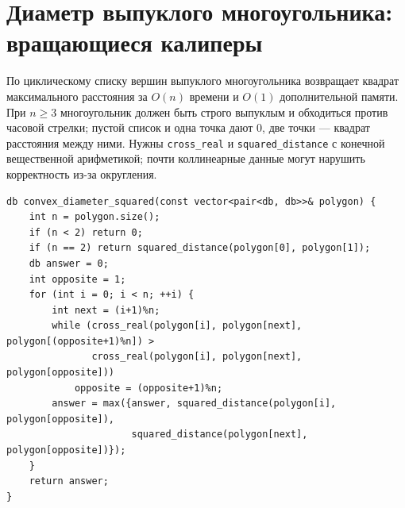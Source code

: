 \section{Диаметр выпуклого многоугольника: вращающиеся калиперы}
По циклическому списку вершин выпуклого многоугольника возвращает квадрат максимального расстояния за $O(n)$ времени и $O(1)$ дополнительной памяти.
При $n\ge3$ многоугольник должен быть строго выпуклым и обходиться против часовой стрелки; пустой список и одна точка дают $0$, две точки --- квадрат расстояния между ними.
Нужны \texttt{cross\_real} и \texttt{squared\_distance} с конечной вещественной арифметикой; почти коллинеарные данные могут нарушить корректность из-за округления.
\begin{lstlisting}[name=geometry_diameter]
db convex_diameter_squared(const vector<pair<db, db>>& polygon) {
    int n = polygon.size();
    if (n < 2) return 0;
    if (n == 2) return squared_distance(polygon[0], polygon[1]);
    db answer = 0;
    int opposite = 1;
    for (int i = 0; i < n; ++i) {
        int next = (i+1)%n;
        while (cross_real(polygon[i], polygon[next], polygon[(opposite+1)%n]) >
               cross_real(polygon[i], polygon[next], polygon[opposite]))
            opposite = (opposite+1)%n;
        answer = max({answer, squared_distance(polygon[i], polygon[opposite]),
                      squared_distance(polygon[next], polygon[opposite])});
    }
    return answer;
}
\end{lstlisting}
\fi

%

\iffalse
